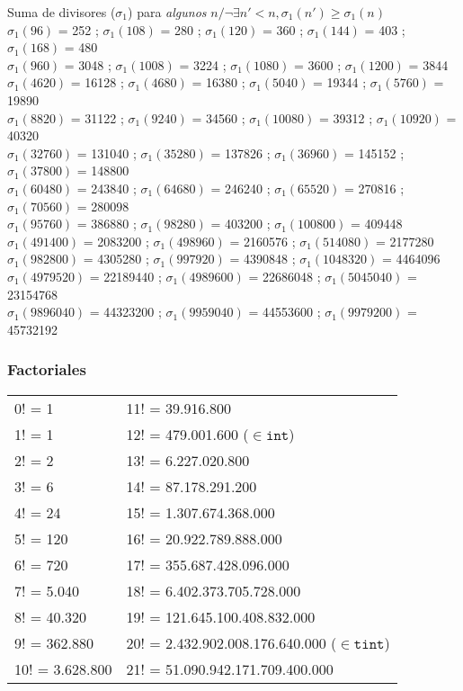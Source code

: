 \documentclass[10pt,landscape,twocolumn,a4paper,notitlepage]{article}
\begin{document}
%
Suma de divisores ($\sigma_1$) para \emph{algunos} $n / \neg\exists n'<n, \sigma_1(n') \geqslant \sigma_1(n)$ \\
$\sigma_1(96)$ = 252 ; $\sigma_1(108)$ = 280 ; $\sigma_1(120)$ = 360 ; $\sigma_1(144)$ = 403 ; $\sigma_1(168)$ = 480 \\
$\sigma_1(960)$ = 3048 ; $\sigma_1(1008)$ = 3224 ; $\sigma_1(1080)$ = 3600 ; $\sigma_1(1200)$ = 3844 \\
$\sigma_1(4620)$ = 16128 ; $\sigma_1(4680)$ = 16380 ; $\sigma_1(5040)$ = 19344 ; $\sigma_1(5760)$ = 19890 \\
$\sigma_1(8820)$ = 31122 ; $\sigma_1(9240)$ = 34560 ; $\sigma_1(10080)$ = 39312 ; $\sigma_1(10920)$ = 40320 \\
$\sigma_1(32760)$ = 131040 ; $\sigma_1(35280)$ = 137826 ; $\sigma_1(36960)$ = 145152 ; $\sigma_1(37800)$ = 148800 \\
$\sigma_1(60480)$ = 243840 ; $\sigma_1(64680)$ = 246240 ; $\sigma_1(65520)$ = 270816 ; $\sigma_1(70560)$ = 280098 \\
$\sigma_1(95760)$ = 386880 ; $\sigma_1(98280)$ = 403200 ; $\sigma_1(100800)$ = 409448  \\
$\sigma_1(491400)$ = 2083200 ; $\sigma_1(498960)$ = 2160576 ; $\sigma_1(514080)$ = 2177280 \\
$\sigma_1(982800)$ = 4305280 ; $\sigma_1(997920)$ = 4390848 ; $\sigma_1(1048320)$ = 4464096 \\
$\sigma_1(4979520)$ = 22189440 ; $\sigma_1(4989600)$ = 22686048 ; $\sigma_1(5045040)$ = 23154768 \\
$\sigma_1(9896040)$ = 44323200 ; $\sigma_1(9959040)$ = 44553600 ; $\sigma_1(9979200)$ = 45732192
%
%
\subsubsection{Factoriales}
\begin{tabular}{l|l}
0! =	1             & 11! = 39.916.800  \\
1! =	1             & 12! =	479.001.600	($\in \mathtt{int}$)\\
2! =	2             & 13! =	6.227.020.800	\\
3! =	6             & 14! =	87.178.291.200	\\
4! =	24            & 15! =	1.307.674.368.000	\\
5! =	120   			  & 16! =	20.922.789.888.000	\\
6! =	720           & 17! =	355.687.428.096.000	\\
7! =	5.040	        & 18! =	6.402.373.705.728.000	\\
8! =	40.320	      & 19! =	121.645.100.408.832.000	\\
9! =	362.880       & 20! =	2.432.902.008.176.640.000	($\in \mathtt{tint}$) \\
10! =	3.628.800     & 21! =	51.090.942.171.709.400.000
\end{tabular}
\end{document}
